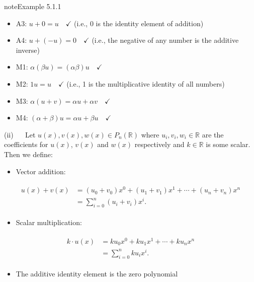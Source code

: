 \documentclass[letterpaper,10pt,english]{jupyterBook}
\begin{document}
\begin{sphinxadmonition}{note}{Example 5.1.1}
\begin{itemize}
\item {} 
\sphinxAtStartPar
A3: \(u + 0 = u \quad \checkmark\) (i.e., 0 is the identity element of addition)

\item {} 
\sphinxAtStartPar
A4: \(u + (-u) = 0 \quad \checkmark\) (i.e., the negative of any number is the additive inverse)

\item {} 
\sphinxAtStartPar
M1: \(\alpha(\beta u) = (\alpha \beta) u \quad \checkmark\)

\item {} 
\sphinxAtStartPar
M2: \(1 u = u \quad \checkmark\) (i.e., 1 is the multiplicative identity of all numbers)

\item {} 
\sphinxAtStartPar
M3: \(\alpha(u + v) = \alpha u + \alpha v \quad \checkmark\)

\item {} 
\sphinxAtStartPar
M4: \((\alpha + \beta) u = \alpha u + \beta u \quad \checkmark\)

\end{itemize}

\sphinxAtStartPar
(ii)   Let \(u(x), v(x), w(x) \in P_n(\mathbb{R})\) where \(u_i, v_i, w_i \in \mathbb{R}\) are the coefficients for \(u(x)\), \(v(x)\) and \(w(x)\) respectively and \(k\in \mathbb{R}\) is some scalar. Then we define:
\begin{itemize}
\item {} 
\sphinxAtStartPar
Vector addition:

\end{itemize}
\begin{equation*}
\begin{split} \begin{align*}
    u(x) + v(x) &= (u_0 + v_0)x^0 + (u_1 + v_1)x^1 + \cdots + (u_n + v_n)x^n \\
    &= \sum_{i=0}^n (u_i + v_i)x^i.
\end{align*} \end{split}
\end{equation*}\begin{itemize}
\item {} 
\sphinxAtStartPar
Scalar multiplication:

\end{itemize}
\begin{equation*}
\begin{split} \begin{align*}
    k \cdot u(x) &= ku_0x^0 + ku_1x^1 + \cdots + ku_nx^n \\
    &= \sum_{i=0}^n ku_ix^i.
\end{align*} \end{split}
\end{equation*}\begin{itemize}
\item {} 
\sphinxAtStartPar
The additive identity element is the zero polynomial


\end{itemize}
\end{sphinxadmonition}
\end{document}
